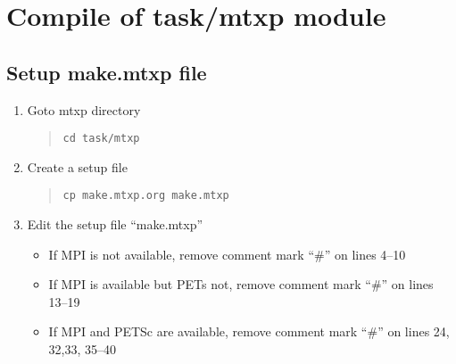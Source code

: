 \documentclass[11pt]{article}
\begin{document}
\section{Compile of task/mtxp module}

\subsection{Setup make.mtxp file}
\begin{enumerate}
\item
Goto mtxp directory
\begin{quote}
\begin{verbatim}
cd task/mtxp
\end{verbatim}
\end{quote}
\item
Create a setup file 
\begin{quote}
\begin{verbatim}
cp make.mtxp.org make.mtxp
\end{verbatim}
\end{quote}
\item
Edit the setup file ``make.mtxp''
\begin{itemize}
\item
If MPI is not available, 
remove comment mark ``\#'' on lines 4--10
\item
If MPI is available but PETs not, 
remove comment mark ``\#'' on lines 13--19
\item
If MPI and PETSc are available, 
remove comment mark ``\#'' on lines 24, 32,33, 35--40
\end{itemize}
\end{enumerate}
\end{document}

